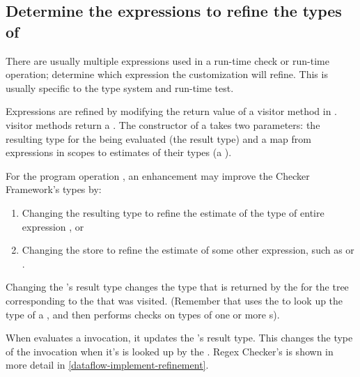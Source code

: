 \subsection{Determine the expressions to refine the types
of\label{dataflow-determine-expressions}}

There are usually multiple expressions used in a run-time check or run-time
operation; determine which expression the customization will refine.  This is
usually specific to the type system and run-time test.

Expressions are refined by modifying the return value of a visitor method in
.
 visitor methods return a
.  The constructor of a
 takes two parameters: the resulting
type for the  being evaluated (the result
type) and a map from expressions in scopes to estimates of their types (a
).

For the program operation , an enhancement may improve the Checker
Framework's types by:
\begin{enumerate}
\item Changing the resulting type to refine the estimate of the type of entire
    expression , or
\item Changing the store to refine the estimate of some other expression, such
    as  or .
\end{enumerate}

Changing the 's result type changes
the type that is returned by the 
for the tree corresponding to the  that was
visited.  (Remember that  uses the
 to look up the type of a
, and then performs checks on types of one or more
s).

When  evaluates a
 invocation, it updates the
's result type. This changes the
type of the  invocation when it's
 is looked up by the
.  Regex Checker's
 is shown in more detail in
\ref{dataflow-implement-refinement}.


